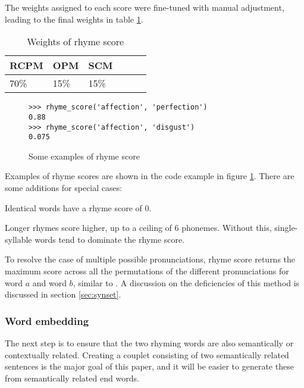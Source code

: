 \documentclass[11pt,a4paper]{article}
\newenvironment{tight_enumerate}{
\begin{enumerate}
\setlength{\itemsep}{0pt}
\setlength{\parskip}{0pt}
}{\end{enumerate}}
\begin{document}
The weights assigned to each score were fine-tuned with manual adjustment, leading to the final weights in table \ref{table:weight_rhyme_score}.

\begin{table}[ht]
\centering
\begin{tabular}{lll c c c}
	\hline\hline
	RCPM & OPM & SCM \\ [0.5ex]
	\hline\hline
	70\% & 15\% & 15\% \\ [0.5ex]
	\hline
\end{tabular}
\caption{Weights of rhyme score}
\label{table:weight_rhyme_score}
\end{table}

\begin{figure}
\begin{Verbatim}[fontsize=\small]
>>> rhyme_score('affection', 'perfection')
0.88
>>> rhyme_score('affection', 'disgust')
0.075
\end{Verbatim}
\caption{Some examples of rhyme score}
\label{fig:rhymescorecode}
\end{figure}

Examples of rhyme scores are shown in the code example in figure \ref{fig:rhymescorecode}. There are some additions for special cases:

\begin{tight_enumerate}
	\vspace{-0.5em}
	\item
		Identical words have a rhyme score of 0.
	\item
		Longer rhymes score higher, up to a ceiling of 6 phonemes. Without this, single-syllable words tend to dominate the rhyme score.
	\item
		To resolve the case of multiple possible pronunciations, rhyme score returns the maximum score across all the permutations of the different pronunciations for word $a$ and word $b$, similar to \citet{keswarani}. A discussion on the deficiencies of this method is discussed in section \ref{sec:synset}.
\end{tight_enumerate}

\subsubsection{Word embedding}
\label{sec:fasttext}
The next step is to ensure that the two rhyming words are also semantically or contextually related. Creating a couplet consisting of two semantically related sentences is the major goal of this paper, and it will be easier to generate these from semantically related end words.
\end{document}

